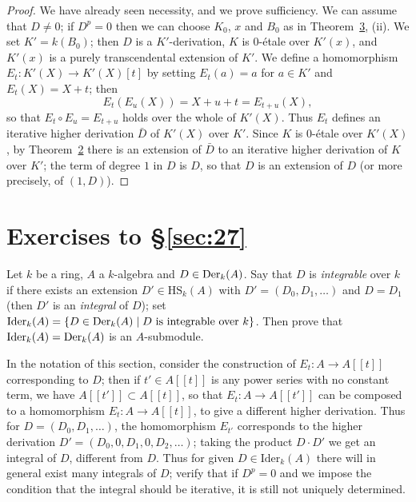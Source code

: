 \begin{proof}
We have already seen necessity, and we prove sufficiency. We can assume that
$D \ne 0$; if $D^p = 0$ then we can choose $K_0$, $x$ and $B_0$ as in Theorem~\hyperref[thm:27.3]{3},
(ii). We set $K' = k(B_0)$; then $D$ is a $K'$-derivation, $K$ is 0-\'etale over
$K'(x)$, and $K'(x)$ is a purely transcendental extension of $K'$. We define a
homomorphism $E_t\colon K'(X) \to K'(X)[t]$ by setting $E_t(a) = a$ for $a \in K'$ and
$E_t(X) = X + t$; then
\[
  E_t(E_u(X)) = X + u + t = E_{t+u}(X),
\]
so that $E_t \circ E_u = E_{t+u}$ holds over the whole of $K'(X)$. Thus $E_t$ defines an
iterative higher derivation $\bar{D}$ of $K'(X)$ over $K'$. Since $K$ is 0-\'etale over
$K'(X)$, by Theorem~\hyperref[thm:27.2]{2} there is an extension of $\bar{D}$ to an iterative higher
derivation of $K$ over $K'$; the term of degree $1$ in $D$ is $D$, so that $D$ is an
extension of $D$ (or more precisely, of $(1, D)$).
\end{proof}

\section*{Exercises to \S\ref{sec:27}}

\begin{exercise}\label{ex:27.1-ex}
Let $k$ be a ring, $A$ a $k$-algebra and $D \in \operatorname{Der}_k(A)$. Say that $D$ is
\emph{integrable} over $k$ if there exists an extension $D' \in \mathrm{HS}_k(A)$ with
$D' = (D_0, D_1, \ldots)$ and $D = D_1$ (then $D'$ is an \emph{integral} of $D$); set
$\mathrm{Ider}_k(A) = \{D \in \operatorname{Der}_k(A) \mid D \text{ is integrable over } k\}$. Then prove
that $\mathrm{Ider}_k(A) = \operatorname{Der}_k(A)$ is an $A$-submodule.
\end{exercise}

\begin{exercise}\label{ex:27.2-ex}
In the notation of this section, consider the construction of $E_t\colon A \to A[[t]]$
corresponding to $D$; then if $t' \in A[[t]]$ is any power series with no constant
term, we have $A[[t']] \subset A[[t]]$, so that $E_t\colon A \to A[[t']]$ can be composed
to a homomorphism $E_t\colon A \to A[[t]]$, to give a different higher derivation.
Thus for $D = (D_0, D_1, \ldots)$, the homomorphism $E_{t'}$ corresponds to the higher
derivation $D' = (D_0, 0, D_1, 0, D_2, \ldots)$; taking the product $D \cdot D'$ we get an
integral of $D$, different from $D$. Thus for given $D \in \mathrm{Ider}_k(A)$ there will in
general exist many integrals of $D$; verify that if $D^p = 0$ and we impose the
condition that the integral should be iterative, it is still not uniquely
determined.
\end{exercise}
